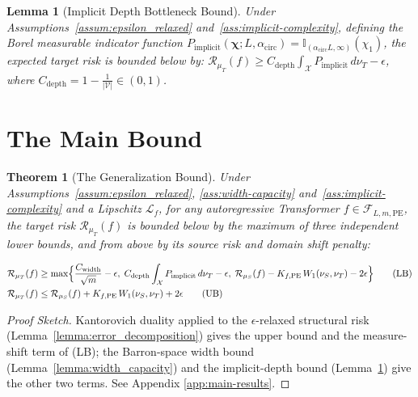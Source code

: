 \documentclass{article}
\newtheorem{lemma}{Lemma}
\newtheorem{theorem}{Theorem}
\begin{document}
\begin{lemma}[Implicit Depth Bottleneck Bound]
\label{lemma:depth_bottleneck}
Under Assumptions~\ref{assum:epsilon_relaxed} and~\ref{ass:implicit-complexity}, defining the Borel measurable indicator function $P_{\mathrm{implicit}}(\boldsymbol{\chi}; L, \alpha_{\mathrm{circ}}) = \mathbb{I}_{(\alpha_{\mathrm{circ}} L, \infty)}(\chi_1)$, the expected target risk is bounded below by: $\mathcal{R}_{\mu_T}(f) \ge C_{\mathrm{depth}} \int_{\mathcal{X}} P_{\mathrm{implicit}} \, d\nu_T - \epsilon$, where $C_{\mathrm{depth}} = 1 - \frac{1}{|\mathcal{V}|} \in (0, 1)$.
\end{lemma}

\section{The Main Bound}
\label{sec:unified_bound}

\begin{theorem}[The Generalization Bound]
\label{thm:unified_bound}
Under Assumptions~\ref{assum:epsilon_relaxed}, \ref{ass:width-capacity} and~\ref{ass:implicit-complexity} and a Lipschitz $\mathcal{L}_f$, for any autoregressive Transformer $f \in \mathcal{F}_{L, m, \mathrm{PE}}$, the target risk $\mathcal{R}_{\mu_T}(f)$ is bounded below by the maximum of three independent lower bounds, and from above by its source risk and domain shift penalty:

{\small
\begin{align}
    \mathcal{R}_{\mu_T}(f) &\ge \max\Bigl\{ \frac{C_{\mathrm{width}}}{\sqrt{m}} - \epsilon,\; C_{\mathrm{depth}} \int_{\mathcal{X}} P_{\mathrm{implicit}} \, d\nu_T - \epsilon,\; \mathcal{R}_{\mu_S}(f) - K_{f, \mathrm{PE}} \, W_1(\nu_S, \nu_T) - 2\epsilon \Bigr\} \tag*{\normalsize(LB)} \label{eq:lower_bound} \\
    \mathcal{R}_{\mu_T}(f) &\le \mathcal{R}_{\mu_S}(f) + K_{f, \mathrm{PE}} \, W_1(\nu_S, \nu_T) + 2\epsilon \tag*{\normalsize(UB)} \label{eq:upper_bound}
\end{align}}
\end{theorem}

\begin{proof}[Proof Sketch]
Kantorovich duality applied to the $\epsilon$-relaxed structural risk (Lemma~\ref{lemma:error_decomposition}) gives the upper bound and the measure-shift term of (LB); the Barron-space width bound (Lemma~\ref{lemma:width_capacity}) and the implicit-depth bound (Lemma~\ref{lemma:depth_bottleneck}) give the other two terms. See Appendix \ref{app:main-results}.
\end{proof}
\end{document}
